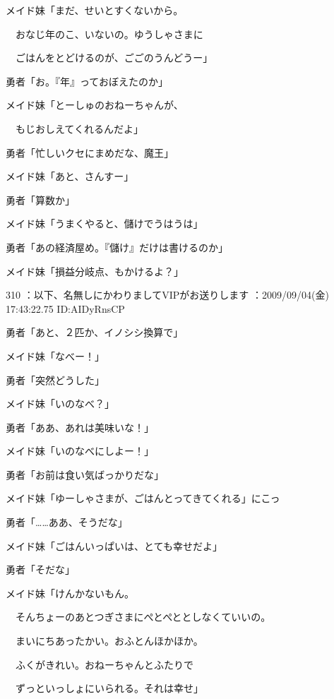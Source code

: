 \documentclass[a4j,twocolumn]{tarticle}
\begin{document}
メイド妹「まだ、せいとすくないから。\par{} 
　おなじ年のこ、いないの。ゆうしゃさまに\par{} 
　ごはんをとどけるのが、ごごのうんどうー」 



勇者「お。『年』っておぼえたのか」\par{} 
メイド妹「とーしゅのおねーちゃんが、\par{} 
　もじおしえてくれるんだよ」 



勇者「忙しいクセにまめだな、魔王」 



メイド妹「あと、さんすー」 



勇者「算数か」\par{} 
メイド妹「うまくやると、儲けでうはうは」\par{} 
勇者「あの経済屋め。『儲け』だけは書けるのか」 



メイド妹「損益分岐点、もかけるよ？」 

	
    
    

310 ：以下、名無しにかわりましてVIPがお送りします ：2009/09/04(金) 17:43:22.75 ID:AIDyRnsCP 


勇者「あと、２匹か、イノシシ換算で」 



メイド妹「なべー！」\par{} 
勇者「突然どうした」 



メイド妹「いのなべ？」 



勇者「ああ、あれは美味いな！」\par{} 
メイド妹「いのなべにしよー！」 



勇者「お前は食い気ばっかりだな」\par{} 
メイド妹「ゆーしゃさまが、ごはんとってきてくれる」にこっ 



勇者「……ああ、そうだな」\par{} 
メイド妹「ごはんいっぱいは、とても幸せだよ」\par{} 
勇者「そだな」 



メイド妹「けんかないもん。\par{} 
　そんちょーのあとつぎさまにぺとぺととしなくていいの。\par{} 
　まいにちあったかい。おふとんほかほか。\par{} 
　ふくがきれい。おねーちゃんとふたりで\par{} 
　ずっといっしょにいられる。それは幸せ」 
\end{document}

